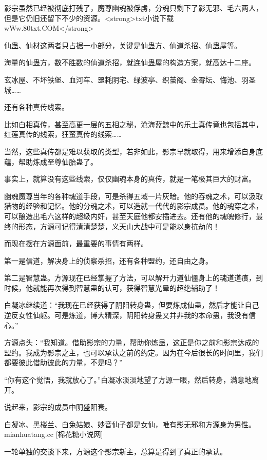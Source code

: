 
\begin{this_body}

影宗虽然已经被彻底打残了，魔尊幽魂被俘虏，分魂只剩下了影无邪、毛六两人，但是它仍旧还留下不少的资源。<strong>txt小说下载wWw.80txt.COM</strong>

仙蛊、仙材这两者只占据一小部分，关键是仙蛊方、仙道杀招、仙蛊屋等。

海量的仙蛊方，数不胜数的仙道杀招，就连仙蛊屋的构造方案，就高达十二座。

玄冰屋、不坏铁堡、血河车、噩耗阴宅、绿波亭、织茧阁、金霄坛、悔池、羽圣城……

还有各种真传线索。

比如白相真传，甚至高更一层的五相之秘，沧海蓝鲸中的乐土真传竟也包括其中，红莲真传的线索，狂蛮真传的线索……

当然，这些真传都是难以获取的类型，若非如此，影宗早就取得，用来增添自身底蕴，帮助炼成至尊仙胎蛊了。

事实上，就算没有这些线索，仅仅幽魂本身的真传，就是一笔极其巨大的财富。

幽魂魔尊当年的各种魂道手段，可是杀得五域一片灰暗。他的吞魂之术，可以汲取猎物的经验和记忆。他的分魂之术，可以造就一代代的影宗成员。他的魂穿之术，可以酿造出毛六这样的超级内奸，甚至天庭他都安插进去。还有他的魂魄修行，最终的形态，方源可记得清清楚楚，义天山大战中可是能以身抗劫的！

而现在摆在方源面前，最重要的事情有两样。

第一是信道，解决身上的侦察杀招，还有各种盟约，还自由之身。

第二是智慧蛊。方源现在已经掌握了方法，可以解开力道仙僵身上的魂道道痕，到时候，他就能再次得到智慧蛊的认可，获得智慧光晕的超绝辅助了！

白凝冰继续道：“我现在已经获得了阴阳转身蛊，但要炼成仙蛊，然后才能让自己逆反女性仙躯。可是炼道，博大精深，阴阳转身蛊又并非我的本命蛊，我没有信心。”

方源点头：“我知道。借助影宗的力量，帮助你炼蛊，这正是你之前和影宗达成的盟约。我成为影宗之主，也可以承认之前的约定。因为在今后很长的时间里，我们都要彼此借助彼此的力量，不是吗？”

“你有这个觉悟，我就放心了。”白凝冰淡淡地望了方源一眼，然后转身，满意地离开。

说起来，影宗的成员中阴盛阳衰。

白凝冰、黑楼兰、白兔姑娘、妙音仙子都是女仙，唯有影无邪和方源身为男性。mianhuatang.cc [棉花糖小说网]

一轮单独的交谈下来，方源这个影宗新主，总算是得到了真正的承认。


\end{this_body}
